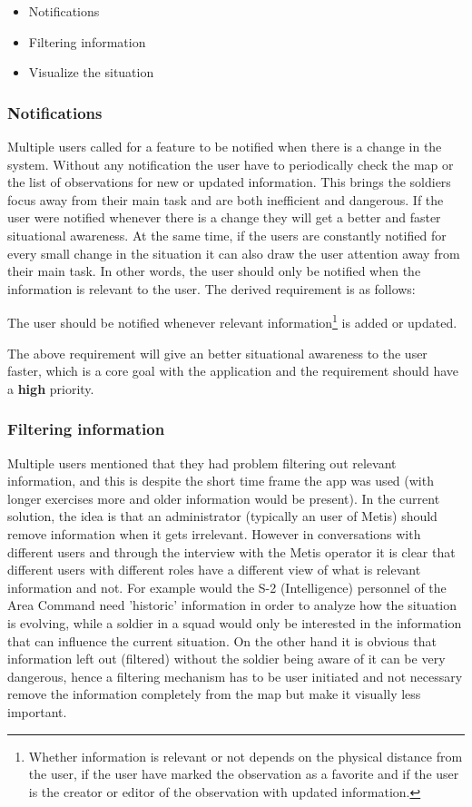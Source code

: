\begin{itemize}
	\item{Notifications}
	\item{Filtering information}
	\item{Visualize the situation}
\end{itemize}


\subsubsection{Notifications}
Multiple users called for a feature to be notified when there is a change in the system. Without any notification the user have to periodically check the map or the list of observations for new or updated information. This brings the soldiers focus away from their main task and are both inefficient and dangerous. If the user were notified whenever there is a change they will get a better and faster situational awareness. At the same time, if the users are constantly notified for every small change in the situation it can also draw the user attention away from their main task. In other words, the user should only be notified when the information is relevant to the user. The derived requirement is as follows:
\begin{requirement}
The user should be notified whenever relevant information\footnote{Whether information is relevant or not depends on the physical distance from the user, if the user have marked the observation as a favorite and if the user is the creator or editor of the observation with updated information.} is added or updated.
\end{requirement}

The above requirement will give an better situational awareness to the user faster, which is a core goal with the application and the requirement should have a \textbf{high} priority. 

\subsubsection{Filtering information}
Multiple users mentioned that they had problem filtering out relevant information, and this is despite the short time frame the app was used (with longer exercises more and older information would be present).  In the current solution, the idea is that an administrator (typically an user of Metis) should remove information when it gets irrelevant\cite{gudmundsen_communication_2016}. However in conversations with different users and through the interview with the Metis operator it is clear that different users with different roles have a different view of what is relevant information and not. For example would the S-2 (Intelligence) personnel of the Area Command need 'historic' information in order to analyze how the situation is evolving, while a soldier in a squad would only be interested in the information that can influence the current situation. On the other hand it is obvious that information left out (filtered) without the soldier being aware of it can be very dangerous, hence a filtering mechanism has to be user initiated and not necessary remove the information completely from the map but make it visually less important. 

